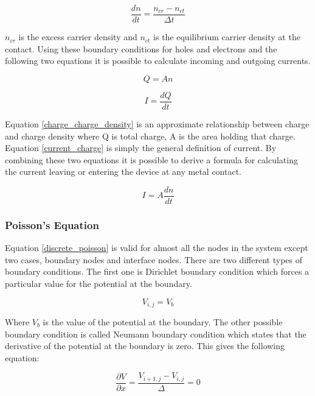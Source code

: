 \begin{doublespace}
\begin{equation}
\frac{dn}{dt}=\frac{n_{cr}-n_{ct}}{\Delta t}
\end{equation}

$n_{cr}$ is the excess carrier density and $n_{ct}$ is the equilibrium carrier density at the contact. Using these boundary conditions for holes and electrons and the following two equations it is possible to calculate incoming and outgoing currents. 

\begin{equation}
Q=An
\label{charge_charge_density}
\end{equation} 

\begin{equation}
I=\frac{dQ}{dt}
\label{current_charge}
\end{equation} 
 

Equation \ref{charge_charge_density} is an approximate relationship between charge and charge density where Q is total charge, A is the area holding that charge. Equation \ref{current_charge} is simply the general definition of current. By combining these two equations it is possible to derive a formula for calculating the current leaving or entering the device at any metal contact.

\begin{equation}
I=A \frac{dn}{dt}
\label{current_charge_density}
\end{equation}

\subsubsection{Poisson's Equation}
Equation \ref{discrete_poisson} is valid for almost all the nodes in the system except two cases, boundary nodes and interface nodes. There are two different types of boundary conditions. The first one is Dirichlet boundary condition which forces a particular value for the potential at the boundary.

\begin{equation}
V_{i,j}=V_{b}
\label{dirichlet}
\end{equation}

Where $V_{b}$ is the value of the potential at the boundary. The other possible boundary condition is called Neumann boundary condition which states that the derivative of the potential at the boundary is zero. This gives the following equation:

\begin{equation}
\frac{\partial V}{\partial x}=\frac{V_{i+1,j}-V_{i,j}}{\Delta}=0
\label{neumannx}
\end{equation}


\end{doublespace}
